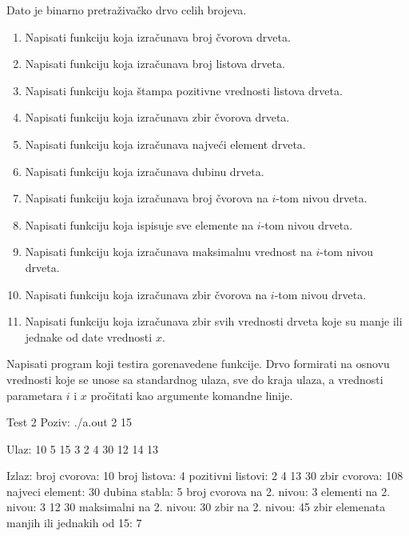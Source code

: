 \begin{Exercise}[label=710]
Dato je binarno pretraživačko drvo celih brojeva.
\begin{enumerate}
\item Napisati funkciju koja izračunava broj čvorova drveta.
\item Napisati funkciju koja izračunava broj listova drveta.
\item Napisati funkciju koja štampa pozitivne vrednosti listova drveta.
\item Napisati funkciju koja izračunava zbir čvorova drveta.
\item Napisati funkciju koja izračunava najveći element drveta.
\item Napisati funkciju koja izračunava dubinu drveta.
\item Napisati funkciju koja izračunava broj čvorova na $i$-tom nivou drveta.
\item Napisati funkciju koja ispisuje sve elemente na $i$-tom nivou drveta.
\item Napisati funkciju koja izračunava maksimalnu vrednost na $i$-tom nivou drveta.
\item Napisati funkciju koja izračunava zbir čvorova na $i$-tom nivou drveta.
\item Napisati funkciju koja izračunava zbir svih vrednosti drveta koje su manje ili jednake od date vrednosti $x$.
\end{enumerate}

Napisati program koji testira gorenavedene funkcije. Drvo formirati na osnovu vrednosti koje se unose
sa standardnog ulaza, sve do kraja ulaza, a vrednosti parametara $i$ i $x$ pročitati kao argumente komandne linije. 


\begin{maxitest}
\begin{test}{Test 2}
Poziv: ./a.out 2 15

Ulaz: 
10 5 15 3 2 4 30 12 14 13

Izlaz: 
broj cvorova: 10
broj listova: 4
pozitivni listovi: 2 4 13 30
zbir cvorova: 108
najveci element: 30
dubina stabla: 5
broj cvorova na 2. nivou: 3
elementi na 2. nivou: 3 12 30
maksimalni na 2. nivou: 30
zbir na 2. nivou: 45
zbir elemenata manjih ili jednakih od 15: 7
\end{test}
\end{maxitest}

\end{Exercise}



